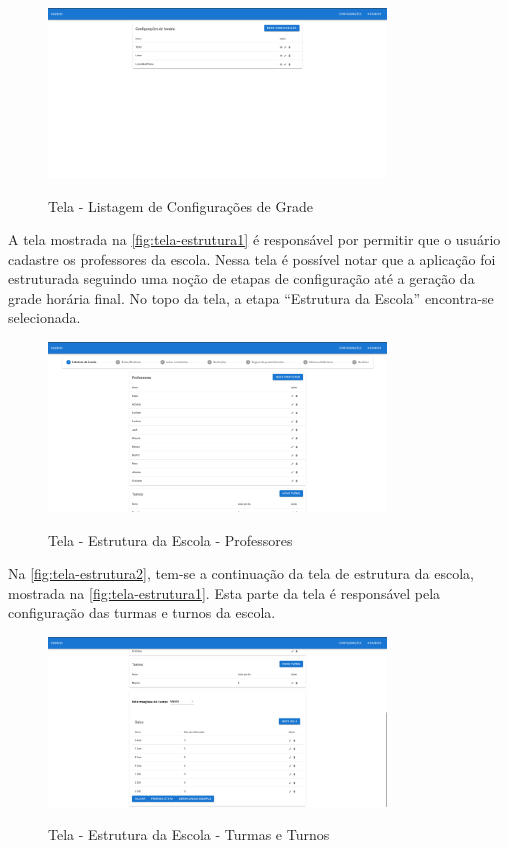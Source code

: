 \begin{figure}[!htb]
	\centering
	\caption{Tela - Listagem de Configurações de Grade}
	\includegraphics[width=0.8\textwidth]{./dados/figuras/tela_configuracoes}
	\label{fig:tela-configuracoes}
\end{figure}
\pagebreak

A tela mostrada na \autoref{fig:tela-estrutura1} é responsável por permitir que o usuário cadastre os professores da escola. Nessa tela é possível notar que a aplicação foi estruturada seguindo uma noção de etapas de configuração até a geração da grade horária final. No topo da tela, a etapa ``Estrutura da Escola'' encontra-se selecionada.

\begin{figure}[!htb]
	\centering
	\caption{Tela - Estrutura da Escola - Professores}
	\includegraphics[width=0.8\textwidth]{./dados/figuras/tela_estrutura1}
	\label{fig:tela-estrutura1}
\end{figure}
\newpage

Na \autoref{fig:tela-estrutura2}, tem-se a continuação da tela de estrutura da escola, mostrada na \autoref{fig:tela-estrutura1}. Esta parte da tela é responsável pela configuração das turmas e turnos da escola.

\begin{figure}[!htb]
	\centering
	\caption{Tela - Estrutura da Escola - Turmas e Turnos}
	\includegraphics[width=0.8\textwidth]{./dados/figuras/tela_estrutura2}
	\label{fig:tela-estrutura2}
\end{figure}

